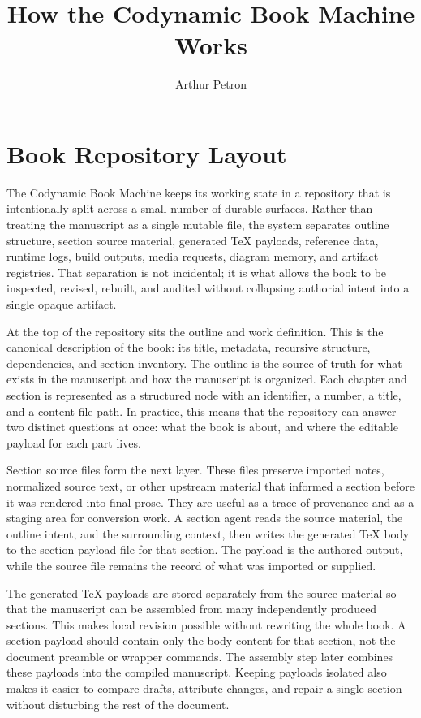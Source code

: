 \documentclass[11pt]{article}
\title{How the Codynamic Book Machine Works}
\author{Arthur Petron}
\begin{document}
\section*{Book Repository Layout}

The Codynamic Book Machine keeps its working state in a repository that is intentionally split across a small number of durable surfaces. Rather than treating the manuscript as a single mutable file, the system separates outline structure, section source material, generated \TeX{} payloads, reference data, runtime logs, build outputs, media requests, diagram memory, and artifact registries. That separation is not incidental; it is what allows the book to be inspected, revised, rebuilt, and audited without collapsing authorial intent into a single opaque artifact.

At the top of the repository sits the outline and work definition. This is the canonical description of the book: its title, metadata, recursive structure, dependencies, and section inventory. The outline is the source of truth for what exists in the manuscript and how the manuscript is organized. Each chapter and section is represented as a structured node with an identifier, a number, a title, and a content file path. In practice, this means that the repository can answer two distinct questions at once: what the book is about, and where the editable payload for each part lives.

Section source files form the next layer. These files preserve imported notes, normalized source text, or other upstream material that informed a section before it was rendered into final prose. They are useful as a trace of provenance and as a staging area for conversion work. A section agent reads the source material, the outline intent, and the surrounding context, then writes the generated \TeX{} body to the section payload file for that section. The payload is the authored output, while the source file remains the record of what was imported or supplied.

The generated \TeX{} payloads are stored separately from the source material so that the manuscript can be assembled from many independently produced sections. This makes local revision possible without rewriting the whole book. A section payload should contain only the body content for that section, not the document preamble or wrapper commands. The assembly step later combines these payloads into the compiled manuscript. Keeping payloads isolated also makes it easier to compare drafts, attribute changes, and repair a single section without disturbing the rest of the document.
\end{document}
